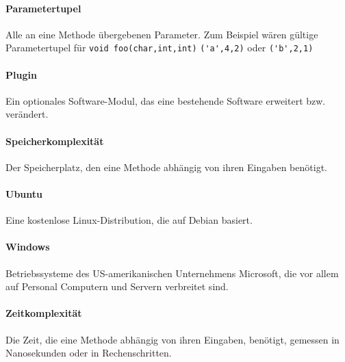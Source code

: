 \documentclass[a4paper]{report}
\begin{document}
\paragraph{Parametertupel} Alle an eine Methode übergebenen Parameter. Zum Beispiel wären gültige Parametertupel für \verb|void foo(char,int,int)| \verb|('a',4,2)| oder \verb|('b',2,1)|

\paragraph{Plugin} Ein optionales Software-Modul, das eine bestehende Software erweitert bzw. verändert.

\paragraph{Speicherkomplexität} Der Speicherplatz, den eine Methode abhängig von ihren Eingaben benötigt.

\paragraph{Ubuntu} Eine kostenlose Linux-Distribution, die auf Debian basiert.

\paragraph{Windows} Betriebssysteme des US-amerikanischen Unternehmens Microsoft, die vor allem auf Personal Computern und Servern verbreitet sind.

\paragraph{Zeitkomplexität} Die Zeit, die eine Methode abhängig von ihren Eingaben, benötigt, gemessen in Nanosekunden oder in Rechenschritten.
\end{document}
